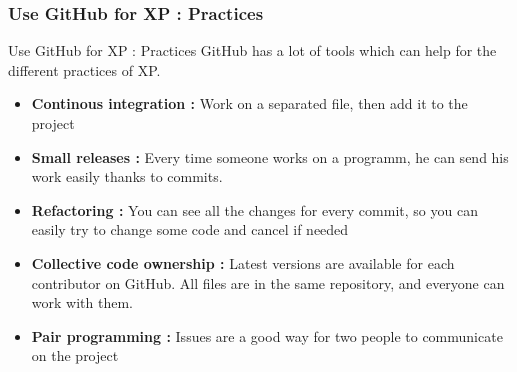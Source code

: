 \begin{frame}

    \frametitle{Use GitHub for XP : Practices}
    \begin{block}{Use GitHub for XP : Practices}
    GitHub has a lot of tools which can help for the different practices of XP.
        \begin{itemize}
        	\item \textbf{Continous integration :} Work on a separated file, then add it to the project \pause
        	\item \textbf{Small releases :} Every time someone works on a programm, he can send his work easily thanks to commits. \pause
        	 \item \textbf{Refactoring :} You can see all the changes for every commit, so you can easily try to change some code and cancel if needed \pause
        	 \item \textbf{Collective code ownership :} Latest versions are available for each contributor on GitHub. All files are in the same repository, and everyone can work with them. \pause
        	 \item \textbf{Pair programming :} Issues are a good way for two people to communicate on the project
        \end{itemize}
    \end{block}
   
\end{frame}
